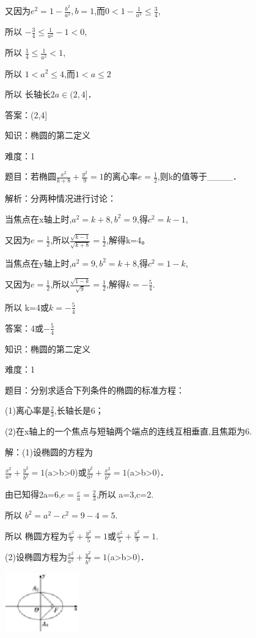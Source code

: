 \documentclass{article} %
\begin{document}
又因为$e^{2}=1-\frac{b^2}{a^2},b=1$,而$0<1-\frac{1}{a^2}{\le}\frac{3}{4}$,

所以 $-\frac{3}{4}{\le}\frac{1}{a^2}-1<0$,

所以 $\frac{1}{4}{\le}\frac{1}{a^2}<1$,

所以 $1<a^{2}{\le}4$,而$1<a{\le}2$

所以 长轴长$2a{\in}(2,4]$．

答案：(2,4]

知识：椭圆的第二定义

难度：1

题目：若椭圆$\frac{x^2}{k+8}+\frac{y^2}{9}=1$的离心率$e=\frac{1}{2}$,则k的值等于\_\_\_\_．

解析：分两种情况进行讨论：

当焦点在x轴上时,$a^{2}=k+8,b^{2}=9$,得$c^{2}=k-1$,

又因为$e=\frac{1}{2}$,所以$\frac{\sqrt{k-1}}{\sqrt{k+8}}=\frac{1}{2}$,解得k=4。

当焦点在y轴上时,$a^{2}=9,b^{2}=k+8$,得$c^{2}=1-k$,

又因为$e=\frac{1}{2}$,所以$\frac{\sqrt{1-k}}{\sqrt{9}}=\frac{1}{2}$,解得$k=-\frac{5}{4}$.

所以 k=4或$k=-\frac{5}{4}$

答案：4或$-\frac{5}{4}$



知识：椭圆的第二定义

难度：1

题目：分别求适合下列条件的椭圆的标准方程：

(1)离心率是$\frac{2}{3}$,长轴长是6；

(2)在x轴上的一个焦点与短轴两个端点的连线互相垂直,且焦距为6.

解：(1)设椭圆的方程为

$\frac{x^2}{a^2}+\frac{y^2}{b^2}=1$(a>b>0)或$\frac{y^2}{a^2}+\frac{x^2}{b^2}=1$(a>b>0)．

由已知得2a=6,$e=\frac{c}{a}=\frac{2}{3}$,所以 a=3,c=2.

所以 $b^{2}=a^{2}-c^{2}=9-4=5$.

所以 椭圆方程为$\frac{x^2}{9}+\frac{y^2}{5}=1$或$\frac{x^2}{5}+\frac{y^2}{9}=1$.

(2)设椭圆方程为$\frac{x^2}{a^2}+\frac{y^2}{b^2}=1$(a>b>0)．

\includegraphics*[width=1.26in, height=1.02in, keepaspectratio=false]{image5}
\end{document}
